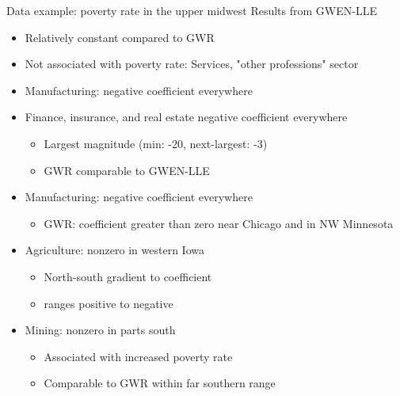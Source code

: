 \documentclass[12pt,t,handout]{beamer}
\newcommand{\subt}[1]{{\footnotesize \color{subtitle} {#1}}}
\begin{document}
\begin{frame}{Data example: poverty rate in the upper midwest}
\subt{Results from GWEN-LLE}

\begin{itemize}
  \item Relatively constant compared to GWR
  \item Not associated with poverty rate: Services, "other professions" sector
  \item Manufacturing: negative coefficient everywhere
  \item Finance, insurance, and real estate negative coefficient everywhere
  \begin{itemize}
    \item Largest magnitude (min: -20, next-largest: -3)
    \item GWR comparable to GWEN-LLE
  \end{itemize}

  \item Manufacturing: negative coefficient everywhere
  \begin{itemize}
    \item GWR: coefficient greater than zero near Chicago and in NW Minnesota
  \end{itemize}

  \item Agriculture: nonzero in western Iowa
  \begin{itemize}
    \item North-south gradient to coefficient
    \item ranges positive to negative
  \end{itemize}

  \item Mining: nonzero in parts south 
  \begin{itemize}
    \item Associated with increased poverty rate
    \item Comparable to GWR within far southern range
  \end{itemize}
\end{itemize}

\end{frame}
\end{document}
